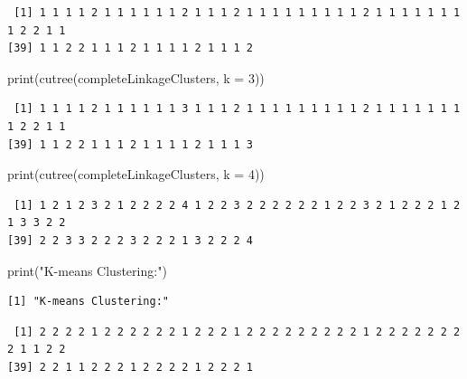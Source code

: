 \documentclass[
  letterpaper,
  DIV=11,
  numbers=noendperiod]{scrartcl}
\newenvironment{Shaded}{}{}
\newcommand{\AttributeTok}[1]{\textcolor[rgb]{0.84,0.60,0.13}{#1}}
\newcommand{\DecValTok}[1]{\textcolor[rgb]{0.96,0.45,0.00}{#1}}
\newcommand{\FunctionTok}[1]{\textcolor[rgb]{0.41,0.62,0.42}{#1}}
\newcommand{\NormalTok}[1]{\textcolor[rgb]{0.24,0.22,0.21}{#1}}
\newcommand{\SpecialCharTok}[1]{\textcolor[rgb]{0.69,0.38,0.53}{#1}}
\newcommand{\StringTok}[1]{\textcolor[rgb]{0.60,0.59,0.10}{#1}}
\begin{document}
\begin{verbatim}
 [1] 1 1 1 1 2 1 1 1 1 1 1 2 1 1 1 2 1 1 1 1 1 1 1 1 1 2 1 1 1 1 1 1 1 1 2 2 1 1
[39] 1 1 2 2 1 1 1 2 1 1 1 1 2 1 1 1 2
\end{verbatim}

\begin{Shaded}
\begin{Highlighting}[]
\FunctionTok{print}\NormalTok{(}\FunctionTok{cutree}\NormalTok{(completeLinkageClusters, }\AttributeTok{k =} \DecValTok{3}\NormalTok{))}
\end{Highlighting}
\end{Shaded}

\begin{verbatim}
 [1] 1 1 1 1 2 1 1 1 1 1 1 3 1 1 1 2 1 1 1 1 1 1 1 1 1 2 1 1 1 1 1 1 1 1 2 2 1 1
[39] 1 1 2 2 1 1 1 2 1 1 1 1 2 1 1 1 3
\end{verbatim}

\begin{Shaded}
\begin{Highlighting}[]
\FunctionTok{print}\NormalTok{(}\FunctionTok{cutree}\NormalTok{(completeLinkageClusters, }\AttributeTok{k =} \DecValTok{4}\NormalTok{))}
\end{Highlighting}
\end{Shaded}

\begin{verbatim}
 [1] 1 2 1 2 3 2 1 2 2 2 2 4 1 2 2 3 2 2 2 2 2 2 1 2 2 3 2 1 2 2 2 1 2 1 3 3 2 2
[39] 2 2 3 3 2 2 2 3 2 2 2 1 3 2 2 2 4
\end{verbatim}

\begin{Shaded}
\begin{Highlighting}[]
\FunctionTok{print}\NormalTok{(}\StringTok{"K{-}means Clustering:"}\NormalTok{)}
\end{Highlighting}
\end{Shaded}

\begin{verbatim}
[1] "K-means Clustering:"
\end{verbatim}

\begin{Shaded}
\end{Shaded}

\begin{verbatim}
 [1] 2 2 2 2 1 2 2 2 2 2 2 1 2 2 2 1 2 2 2 2 2 2 2 2 2 1 2 2 2 2 2 2 2 2 1 1 2 2
[39] 2 2 1 1 2 2 2 1 2 2 2 2 1 2 2 2 1
\end{verbatim}
\end{document}
